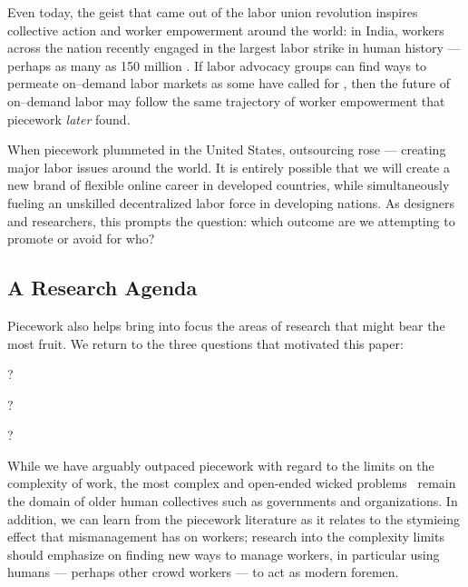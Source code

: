 \documentclass[trackingWork]{subfiles}
\begin{document}
Even today, the geist that came out of the labor union revolution
inspires collective action and worker empowerment around the world:
in India, workers across the nation recently engaged in
the largest labor strike in human history
--- perhaps as many as 150 million
\cite{indiaStrikeRealNews}.
If labor advocacy groups can find ways to permeate on--demand labor markets as some have called for
\cite{futureUnions},
then the future of on--demand labor may follow
the same trajectory of worker empowerment that piecework \textit{later} found.


When piecework plummeted in the United States, outsourcing rose --- creating major labor issues around the world.
It is entirely possible that we will create a new brand of flexible online career in developed countries, while simultaneously fueling an unskilled decentralized labor force in developing nations.
As designers and researchers, this prompts the question: which outcome are we attempting to promote or avoid for who?


\subsection{A Research Agenda}\label{sec:whatShouldBeTheFuture}
Piecework also helps bring into focus the
areas of research that might bear the most fruit.
We return to the three questions that motivated this paper:
\begin{inlinelist}
  \item {}?
  \item {}?
  \item {}?
\end{inlinelist}

While we have arguably outpaced piecework with regard to the limits on the complexity of work,
the most complex and open-ended wicked problems~\cite{rittel1973dilemmas} remain the domain of older human collectives such as governments and organizations. 
In addition, we can learn from the piecework literature as it relates to
the stymieing effect that mismanagement has on workers;
research into the complexity limits should emphasize on finding new ways to manage workers,
in particular using humans --- perhaps other crowd workers ---
to act as modern foremen.
\end{document}
